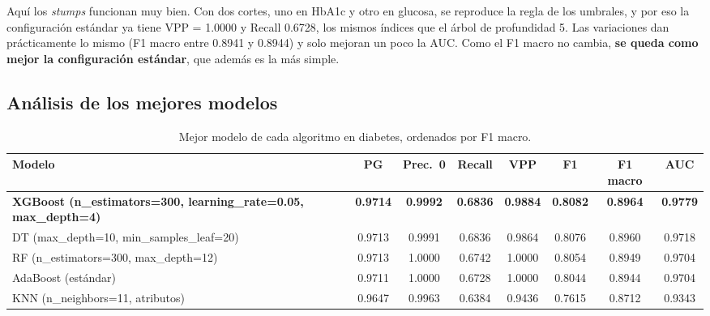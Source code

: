 \documentclass[11pt,a4paper]{article}
\begin{document}
Aquí los \textit{stumps} funcionan muy bien. Con dos cortes, uno en HbA1c y otro en glucosa, se reproduce la regla de los umbrales, y por eso la configuración estándar ya tiene VPP = 1.0000 y Recall 0.6728, los mismos índices que el árbol de profundidad 5. Las variaciones dan prácticamente lo mismo (F1 macro entre 0.8941 y 0.8944) y solo mejoran un poco la AUC. Como el F1 macro no cambia, \textbf{se queda como mejor la configuración estándar}, que además es la más simple.

\subsection{Análisis de los mejores modelos}

\begin{table}[H]
\centering
\small
\caption{Mejor modelo de cada algoritmo en diabetes, ordenados por F1 macro.}
\setlength{\tabcolsep}{4pt}
\begin{tabular}{>{\raggedright\arraybackslash}p{4.9cm}ccccccc}
\toprule
Modelo & PG & Prec.\ 0 & Recall & VPP & F1 & F1 macro & AUC \\
\midrule
\textbf{XGBoost (n\_estimators=\allowbreak{}300, \allowbreak learning\_rate=\allowbreak{}0.05, \allowbreak max\_depth=\allowbreak{}4)} & \textbf{0.9714} & \textbf{0.9992} & \textbf{0.6836} & \textbf{0.9884} & \textbf{0.8082} & \textbf{0.8964} & \textbf{0.9779} \\
DT (max\_depth=\allowbreak{}10, \allowbreak min\_samples\_leaf=\allowbreak{}20) & 0.9713 & 0.9991 & 0.6836 & 0.9864 & 0.8076 & 0.8960 & 0.9718 \\
RF (n\_estimators=\allowbreak{}300, \allowbreak max\_depth=\allowbreak{}12) & 0.9713 & 1.0000 & 0.6742 & 1.0000 & 0.8054 & 0.8949 & 0.9704 \\
AdaBoost (estándar) & 0.9711 & 1.0000 & 0.6728 & 1.0000 & 0.8044 & 0.8944 & 0.9704 \\
KNN (n\_neighbors=\allowbreak{}11, \allowbreak 6 atributos) & 0.9647 & 0.9963 & 0.6384 & 0.9436 & 0.7615 & 0.8712 & 0.9343 \\
\bottomrule
\end{tabular}
\end{table}
\end{document}

